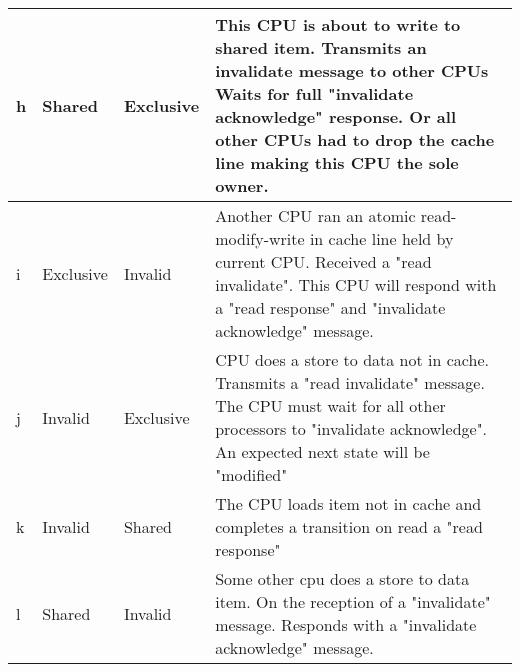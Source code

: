\documentclass{article}
\begin{document}
\begin{tabular} {| l | l | l | p{9cm}| }
    \\
    \hline
    h & Shared & Exclusive & 

    This CPU is about to write to shared item. Transmits an invalidate
    message to other CPUs Waits for full "invalidate acknowledge"
    response. Or all other CPUs had to drop the cache line making this
    CPU the sole owner. \\
    \hline
    i & Exclusive & Invalid & 

    Another CPU ran an atomic read-modify-write in cache line held by
    current CPU. Received a "read invalidate". This CPU will respond
    with a "read response" and "invalidate acknowledge" message.   \\

    \hline

    j & Invalid & Exclusive &

    CPU does a store to data not in cache. Transmits a "read
    invalidate" message. The CPU must wait for all other processors to
    "invalidate acknowledge". An expected next state will be
    "modified"  
    \\
    \hline

    k & Invalid & Shared &
    
    The CPU loads item not in cache and completes a transition on read
    a "read response"     \\


    \hline
    l & Shared & Invalid &
    
    Some other cpu does a store to data item. On the reception of a
    "invalidate" message. Responds with a "invalidate acknowledge"
    message. \\

    \hline    
\end{tabular}


\end{document}
